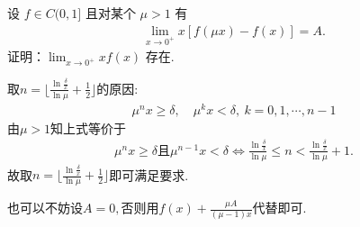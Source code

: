 \documentclass[../../main.tex]{subfiles}%
\begin{document}
\begin{example}
设 $f \in C(0,1]$ 且对某个 $\mu > 1$ 有
\begin{align*}
\lim_{x \to 0^+} x[f(\mu x) - f(x)] = A.
\end{align*}
证明：$\lim_{x \to 0^+} x f(x)$ 存在.
\end{example}
\begin{note}
取$n=\lfloor \frac{\ln \frac{\delta}{x}}{\ln \mu} + \frac{1}{2} \rfloor$的原因:
\begin{align*}
\mu^n x \geqslant \delta, \quad \mu^k x < \delta, \ k=0,1,\cdots,n-1
\end{align*}
由$\mu > 1$知上式等价于
\begin{align*}
\mu^n x \geqslant  \delta \text{且}\mu^{n-1} x <\delta \Longleftrightarrow \frac{\ln \frac{\delta}{x}}{\ln \mu} \leqslant n < \frac{\ln \frac{\delta}{x}}{\ln \mu} + 1.
\end{align*}
故取$n=\lfloor \frac{\ln \frac{\delta}{x}}{\ln \mu} + \frac{1}{2} \rfloor$即可满足要求.
\end{note}
\begin{remark}
也可以不妨设$A=0,$否则用$f(x)+\frac{\mu A}{(\mu - 1)x}$代替即可.
\end{remark}
\end{document}
